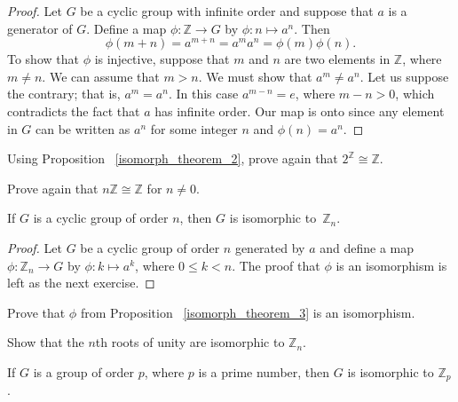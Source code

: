\begin{proof}
Let $G$ be a cyclic group with infinite order and suppose that $a$ is a generator of $G$.  Define a map $\phi : {\mathbb Z} \rightarrow  G$ by $\phi : n \mapsto a^n$. Then 
\[
\phi( m+n ) = a^{m+n} = a^m a^n = \phi( m ) \phi( n ).
\]
To show that $\phi$ is injective, suppose that $m$ and $n$ are two elements in ${\mathbb Z}$, where $m \neq n$.  We can assume that $m > n$.  We must show that $a^m \neq a^n$. Let us suppose the contrary; that is, $a^m = a^n$. In this case $a^{m - n} = e$, where $m - n>0$, which contradicts the fact that $a$ has infinite order.  Our map is onto since any element in $G$ can be written as $a^n$ for some integer $n$ and $\phi(n) = a^n$.   
\end{proof}

\begin{exercise}\label{exercise:isomorph:cyclic_inf_isomorph}
Using Proposition ~\ref{isomorph_theorem_2}, prove again that $2^{\mathbb Z} \cong {\mathbb Z}$.
\end{exercise}

\begin{exercise}\label{exercise:isomorph:cyclic_inf_isomorph2}
Prove again that $n{\mathbb Z} \cong {\mathbb Z}$ for $n \neq 0$.
\end{exercise}

\begin{thm}\label{isomorph_theorem_3}
If $G$ is a cyclic group of order $n$, then $G$ is isomorphic to~${\mathbb Z}_n$.  
\end{thm}
 
\begin{proof}
Let $G$ be a cyclic group of order $n$ generated by $a$ and define a map $\phi : {\mathbb Z}_n \rightarrow  G$ by $\phi : k \mapsto a^k$, where $0 \leq k < n$. The proof that $\phi$ is an isomorphism is left as the next exercise. 
\end{proof}

\begin{exercise}\label{exercise:isomorph:phi_cyclic}
Prove that $\phi$ from Proposition ~\ref{isomorph_theorem_3} is an isomorphism.
\end{exercise}

\begin{exercise}\label{exercise:isomorph:cyclic_n_isomorph}
Show that the $n$th roots of unity are isomorphic to ${\mathbb Z}_n$.
\end{exercise} 

\begin{corollary}\label{isomorph_theorem_4}
If $G$ is a  group of order $p$, where $p$ is a prime number, then $G$ is isomorphic to ${\mathbb Z}_p$. 
\end{corollary}


